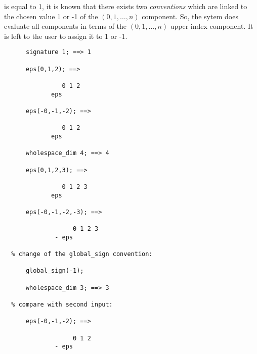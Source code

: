  is equal to 1, it is known that 
there exists
two \emph{conventions} which are linked to the chosen value 1 or -1 of 
the $(0,1,\ldots,n)$ component. So, the sytem does evaluate all components
in terms of  the $(0,1,\ldots,n)$ upper index component. It is left to the user 
to assign it to 1 or -1.
\begin{verbatim}
      signature 1; ==> 1

      eps(0,1,2); ==> 

                0 1 2
             eps

      eps(-0,-1,-2); ==>

                0 1 2
             eps

      wholespace_dim 4; ==> 4

      eps(0,1,2,3); ==>

                0 1 2 3
             eps

      eps(-0,-1,-2,-3); ==>

                   0 1 2 3
              - eps

  % change of the global_sign convention: 
   
      global_sign(-1);

      wholespace_dim 3; ==> 3

  % compare with second input:

      eps(-0,-1,-2); ==>

                   0 1 2
              - eps

\end{verbatim}

